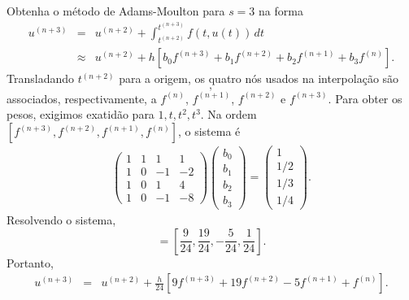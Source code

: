 \begin{ex} Obtenha o método de Adams-Moulton para $s=3$ na forma
\begin{eqnarray}\label{AM4}
u^{(n+3)}&=&u^{(n+2)}+\int_{t^{(n+2)}}^{t^{(n+3)}}f(t,u(t))\,dt\\
&\approx&u^{(n+2)}+h\left[b_0f^{(n+3)}+b_1f^{(n+2)}
+b_2f^{(n+1)}+b_3f^{(n)}\right].
\end{eqnarray}
Transladando $t^{(n+2)}$ para a origem, os quatro nós usados na interpolação são
\begin{equation}
[-2h,-h,0,h],
\end{equation}
associados, respectivamente, a $f^{(n)}$, $f^{(n+1)}$, $f^{(n+2)}$ e $f^{(n+3)}$. Para obter os pesos, exigimos exatidão para $1,t,t^2,t^3$. Na ordem $[f^{(n+3)},f^{(n+2)},f^{(n+1)},f^{(n)}]$, o sistema é
\begin{eqnarray}
\left(
\begin{array}{cccc}
1&1&1&1\\
1&0&-1&-2\\
1&0&1&4\\
1&0&-1&-8
\end{array}
\right)
\left(
\begin{array}{c}
b_0\\b_1\\b_2\\b_3
\end{array}
\right)
=
\left(
\begin{array}{c}
1\\1/2\\1/3\\1/4
\end{array}
\right).
\end{eqnarray}
Resolvendo o sistema,
\begin{equation}
[b_0,b_1,b_2,b_3]
=
\left[\frac{9}{24},\frac{19}{24},-\frac{5}{24},\frac{1}{24}\right].
\end{equation}
Portanto,
\begin{eqnarray}
u^{(n+3)}
&=&u^{(n+2)}
+\frac{h}{24}\left[9f^{(n+3)}+19f^{(n+2)}-5f^{(n+1)}+f^{(n)}\right].
\end{eqnarray}
\end{ex}




